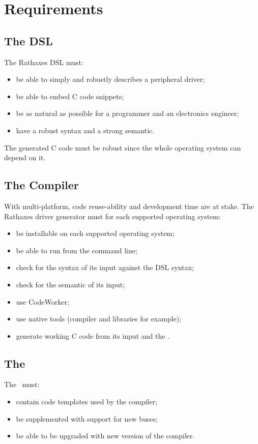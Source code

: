 \section{Requirements}

\subsection{The DSL}

The Rathaxes DSL must:
\begin{itemize}
\item be able to simply and robustly describes a peripheral driver;
\item be able to embed C code snippets;
\item be as natural as possible for a programmer and an electronics engineer;
\item have a robust syntax and a strong semantic.
\end{itemize}

The generated C code must be robust since the whole operating system can depend on
it.

\subsection{The Compiler}

With multi-platform, code reuse-ability and development time are at stake. The
Rathaxes driver generator must for each supported operating system:
\begin{itemize}
\item be installable on each supported operating system;
\item be able to run from the command line;
\item check for the syntax of its input against the DSL syntax;
\item check for the semantic of its input;
\item use CodeWorker\cite{CodeWorker};
\item use native tools (compiler and libraries for example);
\item generate working C code from its input and the \BL.
\end{itemize}

\subsection{The \BL}

The \BL\ must:
\begin{itemize}
\item contain code templates used by the compiler;
\item be supplemented with support for new buses;
\item be able to be upgraded with new version of the compiler.
\end{itemize}

